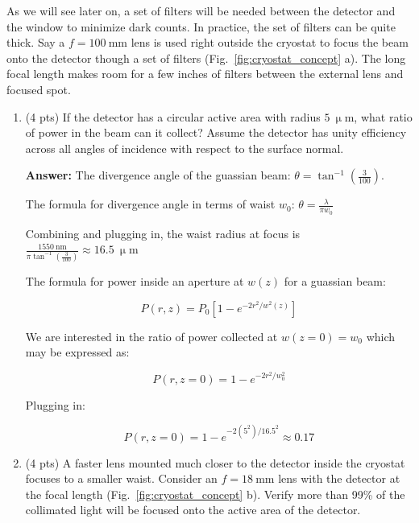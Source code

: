 \documentclass[12pt]{caltech_thesis}
\begin{document}
As we will see later on, a set of filters will be needed between the
detector and the window to minimize dark counts. In practice, the set of
filters can be quite thick. Say a \(f = 100~\mathrm{mm}\) lens is used
right outside the cryostat to focus the beam onto the detector though a
set of filters (Fig.~\ref{fig:cryostat_concept} a). The long focal
length makes room for a few inches of filters between the external lens
and focused spot.

\begin{enumerate}
\def\labelenumi{\arabic{enumi}.}
\item
  (4 pts) If the detector has a circular active area with radius
  \(5~\mathrm{\upmu m}\), what ratio of power in the beam can it
  collect? Assume the detector has unity efficiency across all angles of
  incidence with respect to the surface normal.

  {\color{midnightblue}  \textbf{Answer:} } {\color{midnightblue}  The
  divergence angle of the guassian beam:
  \(\theta = \tan^{-1}({\frac{3}{100}})\). }

  {\color{midnightblue}  The formula for divergence angle in terms of
  waist \(w_0\): \(\theta = \frac{\lambda}{\pi w_0}\) }

  {\color{midnightblue}  Combining and plugging in, the waist radius at
  focus is
  \(\frac{1550~\mathrm{nm}}{\pi \tan^{-1}(\frac{3}{100})} \approx 16.5~ \mathrm{\upmu m}\)
  }

  {\color{midnightblue}  The formula for power inside an aperture at
  \(w(z)\) for a guassian beam:}

  {\color{midnightblue} 

  \[P(r, z)=P_{0}\left[1-e^{-2 r^{2} / w^{2}(z)}\right]\]

  }

  {\color{midnightblue} We are interested in the ratio of power
  collected at \(w(z=0) = w_0\) which may be expressed as:}

  {\color{midnightblue} 

  \[P(r, z=0)=1-e^{-2 r^{2} / w_0^{2}}\]

  }

  {\color{midnightblue} Plugging in: }

  {\color{midnightblue} 

  \[P(r, z=0)=1-e^{-2(5^{2}) / 16.5^{2}} \approx  \boxed{0.17} \]

  }
\item
  (4 pts) A faster lens mounted much closer to the detector inside the
  cryostat focuses to a smaller waist. Consider an
  \(f = 18~\mathrm{mm}\) lens with the detector at the focal length
  (Fig.~\ref{fig:cryostat_concept} b). Verify more than 99\% of the
  collimated light will be focused onto the active area of the detector.


\end{enumerate}
\end{document}
